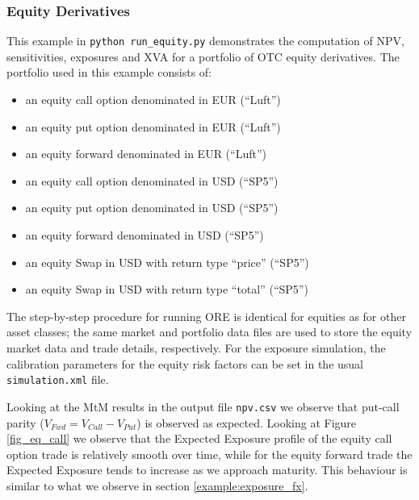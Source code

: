 \subsubsection{Equity Derivatives}\label{example:exposure_equity}

This example in {\tt python run\_equity.py} demonstrates the computation of NPV, sensitivities, exposures and XVA for a portfolio 
of OTC equity derivatives. The portfolio used in this example consists of:

\begin{itemize}
	\item an equity call option denominated in EUR (``Luft'')
	\item an equity put option denominated in EUR (``Luft'')
	\item an equity forward denominated in EUR (``Luft'')
	\item an equity call option denominated in USD (``SP5'')
	\item an equity put option denominated in USD (``SP5'')
	\item an equity forward denominated in USD (``SP5'')
	\item an equity Swap in USD with return type  ``price'' (``SP5'')
	\item an equity Swap in USD with return type ``total'' (``SP5'')
\end{itemize}

The step-by-step procedure for running ORE is identical for equities as for other asset classes; the same market and 
portfolio data files are used to store the equity market data and trade details, respectively. For the exposure 
simulation, the calibration parameters for the equity risk factors can be set in the usual {\tt simulation.xml} file.

Looking at the MtM results in the output file {\tt npv.csv} we observe that put-call parity ($V_{Fwd} = V_{Call} - 
V_{Put}$) is observed as expected. Looking at Figure \ref{fig_eq_call} we observe that the Expected Exposure profile of 
the equity call option trade is relatively smooth over time, while for the equity forward trade the Expected Exposure 
tends to increase as we approach maturity. This behaviour is similar to what we observe in section \ref{example:exposure_fx}.

